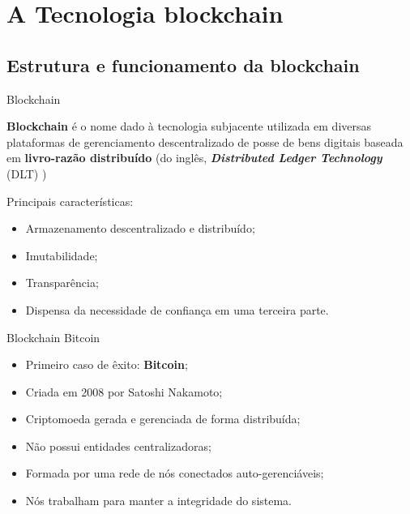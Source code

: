\section{A Tecnologia blockchain}
\subsection{Estrutura e funcionamento da blockchain}

\begin{frame}{Blockchain}
    \begin{block}{}
    \textbf{Blockchain} é o nome dado à tecnologia subjacente utilizada em diversas plataformas
    de gerenciamento descentralizado de posse de bens digitais baseada em \textbf{livro-razão distribuído}
    (do inglês, \textbf{\textit{Distributed Ledger Technology}} (DLT) )
    \end{block}
    Principais características:
    \begin{itemize}
        \item Armazenamento descentralizado e distribuído;
        \item Imutabilidade;
        \item Transparência;
        \item Dispensa da necessidade de confiança em uma terceira parte.
    \end{itemize}
       
\end{frame}

\begin{frame}{Blockchain Bitcoin}
    \begin{itemize}
        \item Primeiro caso de êxito: \textbf{Bitcoin};%
            \item Criada em 2008 por Satoshi Nakamoto;
            \item Criptomoeda gerada e gerenciada de forma distribuída;
            \item Não possui entidades centralizadoras;
            \item Formada por uma rede de nós conectados auto-gerenciáveis;
            \item Nós trabalham para manter a integridade do sistema.
    \end{itemize}
\end{frame}

